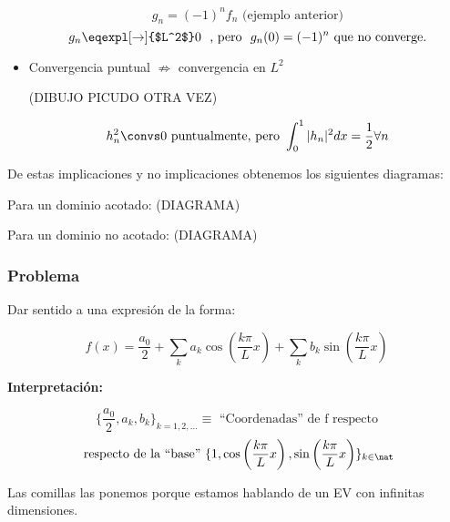 \begin{itemize}
				\begin{example}
					\[g_n = (-1)^n f_n \text{ (ejemplo anterior)}\]
					\[g_n \eqexpl[\rightarrow]{$L^2$} 0 \ \text{ , pero  } \ g_n(0) = (-1)^n \text{ que no converge.}\]

				\end{example}

			\item Convergencia puntual $\not \Rightarrow $ convergencia en $L^2$

				\begin{example}

					(DIBUJO PICUDO OTRA VEZ)

					\[h_n^2 \convs 0 \text{ puntualmente, pero } \int_0^1 |h_n|^2 dx = \frac{1}{2} \forall n \]
				\end{example}

		\end{itemize}

		De estas implicaciones y no implicaciones obtenemos los siguientes diagramas:

		Para un dominio acotado:
		(DIAGRAMA)

		Para un dominio no acotado:
		(DIAGRAMA)

	\subsubsection*{Problema}

		Dar sentido a una expresión de la forma:

		\[ f(x) = \frac{a_0}{2}+ \sum_k a_k \cos \left( \frac{k \pi}{L} x \right) + \sum_k b_k \sin \left( \frac{k \pi}{L} x \right) \]

		\textbf{Interpretación:}

		\[
		\{\frac{a_0}{2},a_k,b_k\}_{k=1,2,…} \equiv \text{ ``Coordenadas'' de f respecto}\]
		\[\text{ respecto de la ``base'' } \{1, \cos \left( \frac{k \pi}{L} x \right), \sin \left( \frac{k \pi}{L} x \right) \}_{k \in \nat }\]

		\obs Las comillas las ponemos porque estamos hablando de un EV con infinitas dimensiones.

